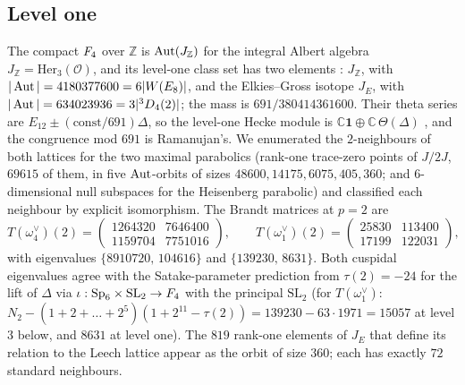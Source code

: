 \documentclass[11pt]{amsart}
\theoremstyle{definition}
\newcommand{\Z}{\mathbb{Z}}\newcommand{\Q}{\mathbb{Q}}\newcommand{\R}{\mathbb{R}}\newcommand{\A}{\mathbb{A}}\newcommand{\F}{\mathbb{F}}
\begin{document}
\subsection{Level one} The compact $F_4$ over $\Z$ is $\Aut(J_\Z)$ for the integral Albert algebra $J_\Z=\mathrm{Her}_3(\mathcal O)$, and its level-one class set has two elements \cite{Gross-Z,EG}: $J_\Z$, with $|\operatorname{Aut}|=4180377600=6|W(E_8)|$, and the Elkies--Gross isotope $J_E$, with $|\operatorname{Aut}|=634023936=3|{}^3D_4(2)|$; the mass is $691/380414361600$. Their theta series are $E_{12}\pm(\text{const}/691)\Delta$, so the level-one Hecke module is $\mathbb{C}\mathbf 1\oplus\mathbb{C}\,\Theta(\Delta)$ \cite{Shan}, and the congruence mod $691$ is Ramanujan's. We enumerated the $2$-neighbours of both lattices for the two maximal parabolics (rank-one trace-zero points of $J/2J$, $69615$ of them, in five $\operatorname{Aut}$-orbits of sizes $48600,14175,6075,405,360$; and $6$-dimensional null subspaces for the Heisenberg parabolic) and classified each neighbour by explicit isomorphism. The Brandt matrices at $p=2$ are
\[T(\omega_4^\vee)(2)=\begin{pmatrix}1264320&7646400\\1159704&7751016\end{pmatrix},\qquad T(\omega_1^\vee)(2)=\begin{pmatrix}25830&113400\\17199&122031\end{pmatrix},\]
with eigenvalues $\{8910720,\,104616\}$ and $\{139230,\,8631\}$. Both cuspidal eigenvalues agree with the Satake-parameter prediction from $\tau(2)=-24$ for the lift of $\Delta$ via $\iota:\mathrm{Sp}_6\times\mathrm{SL}_2\to F_4$ with the principal $\mathrm{SL}_2$ (for $T(\omega_1^\vee)$: $N_2-(1+2+\dots+2^5)(1+2^{11}-\tau(2))=139230-63\cdot1971=15057$ at level $3$ below, and $8631$ at level one). The $819$ rank-one elements of $J_E$ that define its relation to the Leech lattice \cite{EG} appear as the orbit of size $360$; each has exactly $72$ standard neighbours.
\end{document}
